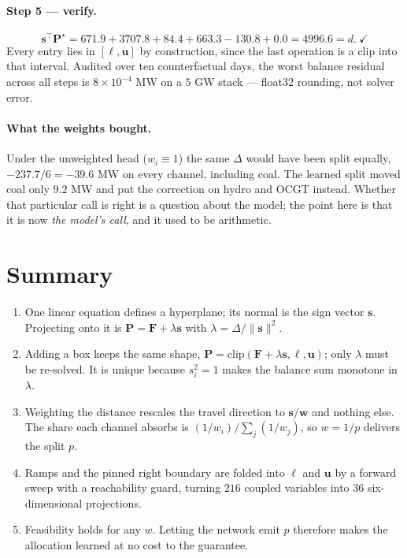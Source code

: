 \documentclass[11pt]{article}
\newcommand{\s}{\mathbf{s}}
\newcommand{\F}{\mathbf{F}}
\newcommand{\Pv}{\mathbf{P}}
\newcommand{\lo}{\bm{\ell}}
\newcommand{\hi}{\mathbf{u}}
\begin{document}
\paragraph{Step 5 --- verify.}
\[
  \s^{\!\top}\Pv^\star = 671.9 + 3707.8 + 84.4 + 663.3 - 130.8 + 0.0
  = 4996.6 = d .\ \checkmark
\]
Every entry lies in $[\lo,\hi]$ by construction, since the last operation is a
clip into that interval. Audited over ten counterfactual days, the worst balance
residual across all steps is $8\times10^{-4}$ MW on a $5$ GW stack --- float32
rounding, not solver error.

\paragraph{What the weights bought.} Under the unweighted head ($w_i \equiv 1$)
the same $\Delta$ would have been split equally, $-237.7/6 = -39.6$ MW on every
channel, including coal. The learned split moved coal only $9.2$ MW and put the
correction on hydro and OCGT instead. Whether that particular call is right is a
question about the model; the point here is that it is now \emph{the model's
call}, and it used to be arithmetic.

\section*{Summary}

\begin{enumerate}
\item One linear equation defines a hyperplane; its normal is the sign vector
      $\s$. Projecting onto it is $\Pv = \F + \lambda\s$ with
      $\lambda = \Delta / \lVert\s\rVert^2$.
\item Adding a box keeps the same shape,
      $\Pv = \mathrm{clip}(\F + \lambda\s, \lo, \hi)$; only $\lambda$ must be
      re-solved. It is unique because $s_i^2 = 1$ makes the balance sum
      monotone in $\lambda$.
\item Weighting the distance rescales the travel direction to $\s/\mathbf{w}$
      and nothing else. The share each channel absorbs is
      $(1/w_i)/\sum_j (1/w_j)$, so $w = 1/p$ delivers the split $p$.
\item Ramps and the pinned right boundary are folded into $\lo$ and $\hi$ by a
      forward sweep with a reachability guard, turning $216$ coupled variables
      into $36$ six-dimensional projections.
\item Feasibility holds for any $w$. Letting the network emit $p$ therefore
      makes the allocation learned at no cost to the guarantee.
\end{enumerate}
\end{document}
